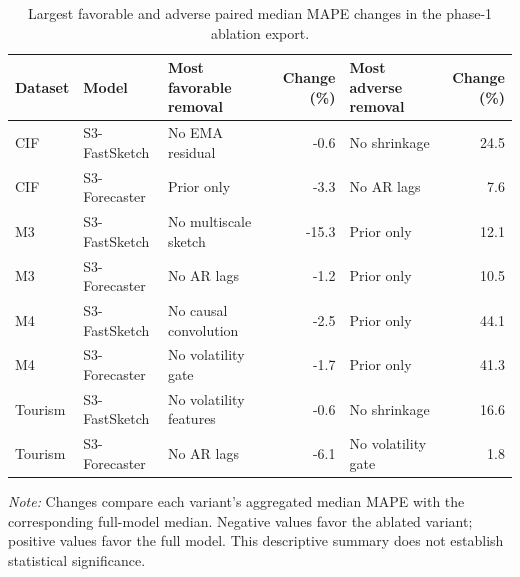 \begin{table}[t]
\centering
\caption{Largest favorable and adverse paired median MAPE changes in the phase-1 ablation export.}
\label{tab:ablation_extremes_phase1}
\footnotesize
\setlength{\tabcolsep}{4pt}
\begin{tabular}{lllrlr}
\toprule
Dataset & Model & Most favorable removal & Change (\%) & Most adverse removal & Change (\%) \\
\midrule
CIF & S3-FastSketch & No EMA residual & -0.6 & No shrinkage & 24.5 \\
CIF & S3-Forecaster & Prior only & -3.3 & No AR lags & 7.6 \\
M3 & S3-FastSketch & No multiscale sketch & -15.3 & Prior only & 12.1 \\
M3 & S3-Forecaster & No AR lags & -1.2 & Prior only & 10.5 \\
M4 & S3-FastSketch & No causal convolution & -2.5 & Prior only & 44.1 \\
M4 & S3-Forecaster & No volatility gate & -1.7 & Prior only & 41.3 \\
Tourism & S3-FastSketch & No volatility features & -0.6 & No shrinkage & 16.6 \\
Tourism & S3-Forecaster & No AR lags & -6.1 & No volatility gate & 1.8 \\
\bottomrule
\end{tabular}
\begin{minipage}{0.98\textwidth}
\footnotesize\emph{Note:} Changes compare each variant's aggregated median MAPE with the corresponding full-model median. Negative values favor the ablated variant; positive values favor the full model. This descriptive summary does not establish statistical significance.
\end{minipage}
\end{table}
